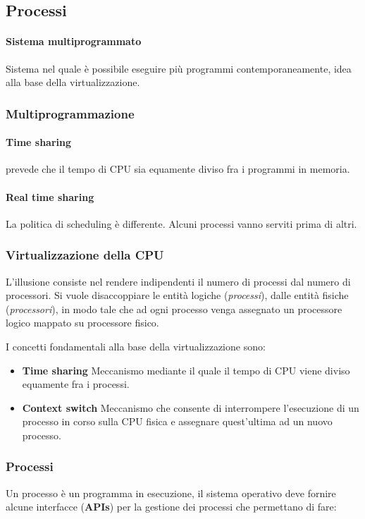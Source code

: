 \documentclass[12pt, twoside, letterpaper]{article}
\begin{document}
		\subsection{Processi}
			
			\paragraph{Sistema multiprogrammato} Sistema nel quale è possibile eseguire più programmi contemporaneamente, idea alla base della virtualizzazione.
			
			\subsubsection{Multiprogrammazione}
				
				\paragraph{Time sharing} prevede che il tempo di CPU sia equamente diviso fra i programmi in memoria. 
				\paragraph{Real time sharing} La politica di scheduling è differente. Alcuni processi vanno serviti prima di altri.
				
			\subsubsection{Virtualizzazione della CPU}
				L'illusione consiste nel rendere indipendenti il numero di processi dal numero di processori. Si vuole disaccoppiare le entità logiche (\textit{processi}), dalle entità fisiche (\textit{processori}), in modo tale che ad ogni processo venga assegnato un processore logico mappato su processore fisico.
				
				I concetti fondamentali alla base della virtualizzazione sono: 
				\begin{itemize}
					\item \textbf{Time sharing} Meccanismo mediante il quale il tempo di CPU viene diviso equamente fra i processi.
					\item \textbf{Context switch} Meccanismo che consente di interrompere l'esecuzione di un processo in corso sulla CPU fisica e assegnare quest'ultima ad un nuovo processo.
				\end{itemize}				 
				
			\subsubsection{Processi} Un processo è un programma in esecuzione, il sistema operativo deve fornire alcune interfacce (\textbf{APIs}) per la gestione dei processi che permettano di fare:
			
\end{document}
